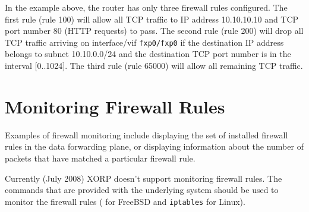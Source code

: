 \vspace{0.1in}
In the example above, the router has only three firewall rules
configured. The first rule (rule 100) will allow all TCP traffic to IP
address 10.10.10.10 and TCP port number 80 (\ie HTTP requests) to pass.
The second rule (rule 200) will drop all TCP traffic arriving on
interface/vif {\tt fxp0/fxp0} if the destination IP address belongs to
subnet 10.10.0.0/24 and the destination TCP port number is in the
interval [0..1024].
The third rule (rule 65000) will allow all remaining TCP traffic.


\newpage
\section{Monitoring Firewall Rules}

Examples of firewall monitoring include displaying the set of installed
firewall rules in the data forwarding plane, or displaying information
about the number of packets that have matched a particular firewall
rule.

Currently (July 2008) XORP doesn't support monitoring firewall rules.
The commands that are provided with the underlying system should be used
to monitor the firewall rules ( for FreeBSD and
{\tt iptables} for Linux).
